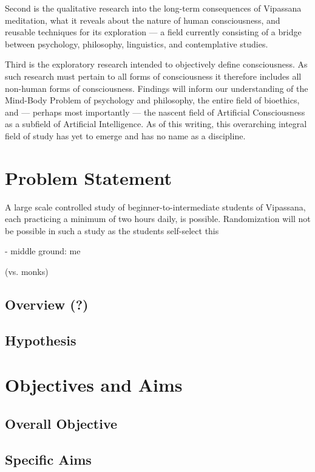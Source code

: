 \documentclass[a4paper, amsfonts, amssymb, amsmath, reprint, showkeys, nofootinbib, twoside]{revtex4-1}
\begin{document}
Second is the qualitative research into the long-term consequences of
Vipassana meditation, what it reveals about the nature of human consciousness, and
reusable techniques for its exploration --- a field currently consisting of a bridge
between psychology, philosophy, linguistics, and contemplative studies.

Third is the exploratory research intended to objectively define
consciousness. As such research must pertain to all forms of consciousness it
therefore includes all non-human forms of consciousness. Findings will inform our
understanding of the Mind-Body Problem of psychology and philosophy, the entire field
of bioethics, and --- perhaps most importantly --- the nascent field of Artificial
Consciousness as a subfield of Artificial Intelligence. \cite{hildt2019} As of this
writing, this overarching integral field of study has yet to emerge and has no name
as a discipline.

\section{Problem Statement}

A large scale controlled study of beginner-to-intermediate
students of Vipassana, each practicing a minimum of two hours daily, is
possible. Randomization will not be possible in such a study as the students
self-select this

- middle ground: me

(vs. monks)

\subsection{Overview (?)}
\subsection{Hypothesis}

\section{Objectives and Aims}

\subsection{Overall Objective}
\subsection{Specific Aims}
\end{document}
